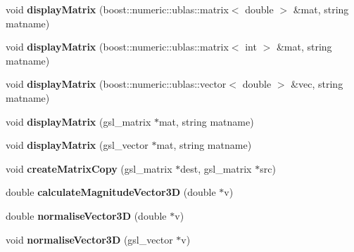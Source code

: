 \begin{DoxyCompactItemize}
\item 
\hypertarget{classShapeBase_a488d30bfef98b1f1786d8d2b8ec17b99}{}void {\bfseries display\+Matrix} (boost\+::numeric\+::ublas\+::matrix$<$ double $>$ \&mat, string matname)\label{classShapeBase_a488d30bfef98b1f1786d8d2b8ec17b99}

\item 
\hypertarget{classShapeBase_a32973247ffcf77c2fd03f5d00c9fda42}{}void {\bfseries display\+Matrix} (boost\+::numeric\+::ublas\+::matrix$<$ int $>$ \&mat, string matname)\label{classShapeBase_a32973247ffcf77c2fd03f5d00c9fda42}

\item 
\hypertarget{classShapeBase_ae121abd34a8206b1f6e6829987ddf5c6}{}void {\bfseries display\+Matrix} (boost\+::numeric\+::ublas\+::vector$<$ double $>$ \&vec, string matname)\label{classShapeBase_ae121abd34a8206b1f6e6829987ddf5c6}

\item 
\hypertarget{classShapeBase_a51b06b089203d187455c97065ad57499}{}void {\bfseries display\+Matrix} (gsl\+\_\+matrix $\ast$mat, string matname)\label{classShapeBase_a51b06b089203d187455c97065ad57499}

\item 
\hypertarget{classShapeBase_af9a10295e67e1f9047d0800ec6b30b0c}{}void {\bfseries display\+Matrix} (gsl\+\_\+vector $\ast$mat, string matname)\label{classShapeBase_af9a10295e67e1f9047d0800ec6b30b0c}

\item 
\hypertarget{classShapeBase_a4b37ec963a6078a7e03512d23470c257}{}void {\bfseries create\+Matrix\+Copy} (gsl\+\_\+matrix $\ast$dest, gsl\+\_\+matrix $\ast$src)\label{classShapeBase_a4b37ec963a6078a7e03512d23470c257}

\item 
\hypertarget{classShapeBase_ac5d2cfe341eceb73f39d90955356f7b8}{}double {\bfseries calculate\+Magnitude\+Vector3\+D} (double $\ast$v)\label{classShapeBase_ac5d2cfe341eceb73f39d90955356f7b8}

\item 
\hypertarget{classShapeBase_aeedf5dc5bdb68820c143ee5ef75c01a9}{}double {\bfseries normalise\+Vector3\+D} (double $\ast$v)\label{classShapeBase_aeedf5dc5bdb68820c143ee5ef75c01a9}

\item 
\hypertarget{classShapeBase_a9e7ca6bbc30107ed82e73694f9c34717}{}void {\bfseries normalise\+Vector3\+D} (gsl\+\_\+vector $\ast$v)\label{classShapeBase_a9e7ca6bbc30107ed82e73694f9c34717}


\end{DoxyCompactItemize}

